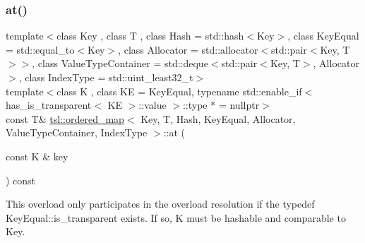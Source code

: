 \subsubsection{\texorpdfstring{at()}{at()}\hspace{0.1cm}{\footnotesize\ttfamily [5/6]}}
{\footnotesize\ttfamily template$<$class Key , class T , class Hash  = std\+::hash$<$\+Key$>$, class Key\+Equal  = std\+::equal\+\_\+to$<$\+Key$>$, class Allocator  = std\+::allocator$<$std\+::pair$<$\+Key, T$>$$>$, class Value\+Type\+Container  = std\+::deque$<$std\+::pair$<$\+Key, T$>$, Allocator$>$, class Index\+Type  = std\+::uint\+\_\+least32\+\_\+t$>$ \\
template$<$class K , class KE  = Key\+Equal, typename std\+::enable\+\_\+if$<$ has\+\_\+is\+\_\+transparent$<$ K\+E $>$\+::value $>$\+::type $\ast$  = nullptr$>$ \\
const T\& \mbox{\hyperlink{classtsl_1_1ordered__map}{tsl\+::ordered\+\_\+map}}$<$ Key, T, Hash, Key\+Equal, Allocator, Value\+Type\+Container, Index\+Type $>$\+::at (\begin{DoxyParamCaption}\item[{const K \&}]{key }\end{DoxyParamCaption}) const\hspace{0.3cm}{\ttfamily [inline]}}





This overload only participates in the overload resolution if the typedef Key\+Equal\+::is\+\_\+transparent exists. If so, K must be hashable and comparable to Key. \mbox{\label{classtsl_1_1ordered__map_a94ca924689a733f0f2b2d958013c6ef9}} 
